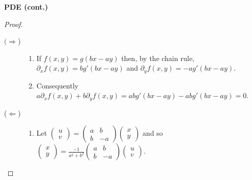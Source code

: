 \textbf{PDE (cont.)}

\begin{proof}
    \begin{description}
        \item[\((\Rightarrow\))]
              \begin{enumerate}
                  \item If \(f(x,y)= g(bx-ay)\) then, by the chain rule,
                        \(\partial_x f(x,y) = bg'(bx-ay)\) and \(\partial_y f(x,y) = -ag'(bx-ay)\).
                  \item
                        Consequently \(a\partial_x f(x,y) + b \partial_y f(x,y) = a bg'(bx-ay) - abg'(bx-ay) = 0\).
              \end{enumerate}

        \item[(\(\Leftarrow\))]
              \begin{enumerate}
                  \item Let \(\left(\begin{smallmatrix}
                                u\\ v
                            \end{smallmatrix}\right)
                        = \left(\begin{smallmatrix}
                                a & b \\ b & -a
                            \end{smallmatrix}\right)
                        \left(\begin{smallmatrix}
                                x \\ y
                            \end{smallmatrix}\right)\)
                        and so
                        \(\left(\begin{smallmatrix}
                                x\\ y
                            \end{smallmatrix}\right)
                        = \frac{-1}{a^2 + b^2} \left(\begin{smallmatrix}
                                a & b \\ b & -a
                            \end{smallmatrix}\right)
                        \left(\begin{smallmatrix}
                                u \\ v
                            \end{smallmatrix}\right)\).

\end{enumerate}
\end{description}
\end{proof}
